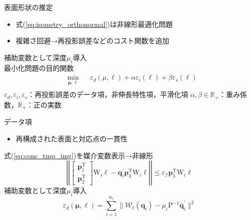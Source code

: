 \documentclass[dvipdfmx]{beamer}
\def\eqref#1{式(\ref{#1})}
\begin{document}
  \begin{frame}{表面形状の推定}
      \begin{itemize}
          \item \eqref{eq:isometry_orthonormal}は非線形最適化問題
          \item 複雑さ回避→再投影誤差などのコスト関数を追加
      \end{itemize}
    補助変数として深度$\mu_i$導入 \\
    最小化問題の目的関数
    \begin{equation}
        \begin{aligned}
            & \underset{\bm{\mu}, \bm{\ell}} {\text{min}} && \varepsilon_{d}(\mu, \bm{\ell}) + \alpha \varepsilon_i(\bm{\ell})+\beta\varepsilon_s(\bm{\ell})\\
        \end{aligned}
        \label{eq:evaluate}
    \end{equation}
    $\varepsilon_d,\varepsilon_i, \varepsilon_s$：再投影誤差のデータ項，非伸長特性項，平滑化項
    $\alpha, \beta \in \mathbb{R}_+$：重み係数，$\mathbb{R}_+$：正の実数
  \end{frame}
  \begin{frame}{データ項}
    \begin{itemize}
        \item 再構成された表面と対応点の一貫性
    \end{itemize}
    \eqref{eq:cons_tmp_img}を媒介変数表示→非線形
    \begin{equation}
        \left|\left| 
        \left[
        \begin{array}{c}
          \mathrm{\bm{p}}_1^{\mathrm{T}}   \\
          \mathrm{\bm{p}}_2^{\mathrm{T}}
        \end{array}
        \right]\mathrm{W}_i\bm{\ell}
        - \bm{q}_i^{\prime}\mathrm{\bm{p}}_3^{\mathrm{T}} \mathrm{W}_i\bm{\ell} \right|\right|
        \le \varepsilon_{\mathcal{I}}\mathrm{\bm{p}}_3^{\mathrm{T}} \mathrm{W}_i\bm{\ell}
     \label{eq:cons_tmp_replace}
    \end{equation}
    補助変数として深度$\mu_i$導入 \\
    \begin{equation}
        \varepsilon_d(\bm{\mu},\bm{\ell}) = \sum_{i=1}^{n_c} \|\mathcal{W}_{\ell}(\mathrm{\bm{q}}_i) - \mu_i\mathrm{P}^{-1}\overline{\mathrm{\bm{q}}}_i^{\prime} \|^2
        \label{eq:3derror}
    \end{equation}
  \end{frame}
\end{document}

